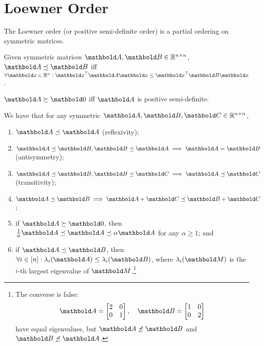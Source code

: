 \section{Loewner Order}

The Loewner order (or positive semi-definite order) is a partial ordering on symmetric matrices.

\begin{defn}
Given symmetric matrices $\mA, \mB \in \R^{n \times n}$, $\mA \preceq \mB$ iff $\forall \vx \in \R^n: \trans{\vx}\mA\vx \leq \trans{\vx}\mB\vx$.
\end{defn}
\begin{rmk}
$\mA \succeq \mZero$ iff $\mA$ is positive semi-definite.
\end{rmk}

\begin{lem} We have that for any symmetric $\mA, \mB, \mC \in \R^{n \times n}$,
\begin{enumerate}
    \item $\mA \preceq \mA$ (reflexivity);
    \item $\mA \preceq \mB, \mB \preceq \mA \implies \mA = \mB$ (antisymmetry);
    \item $\mA \preceq \mB, \mB \preceq \mC \implies \mA \preceq \mC$ (transitivity);
    \item $\mA \preceq \mB \implies \mA + \mC \preceq \mB + \mC$;
    \item if $\mA \succeq \mZero$, then $\frac{1}{\alpha}\mA \preceq \mA \preceq \alpha\mA$ for any $\alpha \geq 1$; and
    \item if $\mA \preceq \mB$, then $\forall i \in [n]: \lambda_i(\mA) \leq \lambda_i(\mB)$, where $\lambda_i(\mM)$ is the $i$-th largest eigenvalue of $\mM$.\footnote{The converse is false: \begin{align*}
        \mA \defeq \begin{bmatrix}
            2 & 0 \\
            0 & 1 \\
        \end{bmatrix}, \quad \mB \defeq \begin{bmatrix}
            1 & 0 \\
            0 & 2 \\
        \end{bmatrix}
    \end{align*} have equal eigenvalues, but $\mA \not\preceq \mB$ and $\mB \not\preceq \mA$.}
\end{enumerate}
\end{lem}
